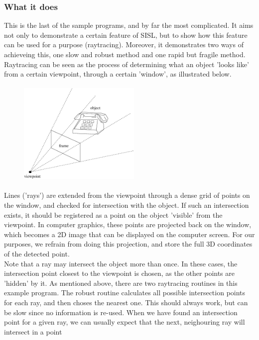 \subsubsection{What it does}
This is the last of the sample programs, and by far the most complicated.  It aims not only to 
demonstrate a certain feature of SISL, but to show how this feature can be used for a purpose
(raytracing).  Moreover, it demonstrates two ways of achieveing this, one slow and robust method
and one rapid but fragile method. \\
Raytracing can be seen as the process of determining what an object 'looks like' from a 
certain viewpoint, through a certain 'window', as illustrated below.
\begin{figure}[h]
\begin{center}
\includegraphics[width=2.3in, height=2in,angle = 0]{raytracing.ps}
\end{center}
\end{figure}
Lines ('rays') are extended from the viewpoint through a dense grid of points on the window,
and checked for intersection with the object.  If such an intersection exists, it should be 
registered as a point on the object 'visible' from the viewpoint.  In computer graphics, these 
points are projected back on the window, which becomes a 2D image that can be displayed on the
computer screen.  For our purposes, we refrain from doing this projection, and store the 
full 3D coordinates of the detected point.\\
Note that a ray may intersect the object more than once.  In these cases, the intersection point
closest to the viewpoint is chosen, as the other points are 'hidden' by it.  As mentioned above,
there are two raytracing routines in this example program.  The robust routine calculates all
possible intersection points for each ray, and then choses the nearest one.  This should always
work, but can be slow since no information is re-used.  When we have found an intersection point
for a given ray, we can usually expect that the next, neighouring ray will intersect in a point
